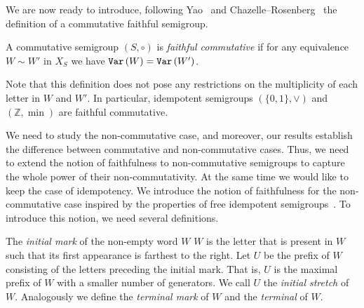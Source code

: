 \documentclass{toc}
\begin{document}
We are now ready to introduce,
following Yao~\cite{DBLP:conf/stoc/Yao82} and
Chazelle--Rosenberg~\cite{DBLP:journals/ijcga/ChazelleR91}  %
the definition of a commutative faithful semigroup.

\begin{definition}[Yao, Chazelle--Rosenberg]  %
\label{def:faithfulcommutative}
A commutative semigroup $(S, \circ)$ is \emph{faithful commutative} if for any
equivalence $W\sim W'$ in $X_S$ we have $\texttt{Var}\,(W)=\texttt{Var}\,(W')$.
\end{definition}


Note that this definition does not pose any restrictions on the
multiplicity
of
each letter %
in $W$ and $W'$. In particular, %
idempotent semigroups
$(\{0,1\}, \vee)$ and $(\mathbb{Z},\min)$ are faithful commutative. %

We need to study the non-commutative case, and moreover, our results
establish the difference between commutative and non-commutative cases. Thus,
we need to extend the notion of faithfulness to non-commutative semigroups to
capture %
the whole power of their non-commutativity.  %
At the same time we would
like to keep the case of idempotency. We introduce the notion of faithfulness
for the non-commutative case inspired by the properties of free idempotent
semigroups~\cite{GreenR52}. To introduce this notion, we need several
definitions.


\begin{definition}
The \emph{initial mark} of
the non-empty word $W$  %
$W$ is the letter that is present in $W$ such that
its first appearance is farthest to the right. Let $U$ be the prefix of $W$
consisting of
the  %
letters preceding the initial mark. That is, $U$ is the maximal
prefix of $W$ with a smaller number of generators. We call $U$ the
\emph{initial stretch} %
of $W$. Analogously we define the \emph{terminal mark} of $W$ and
the \emph{terminal} of $W$.
\end{definition}
\end{document}
